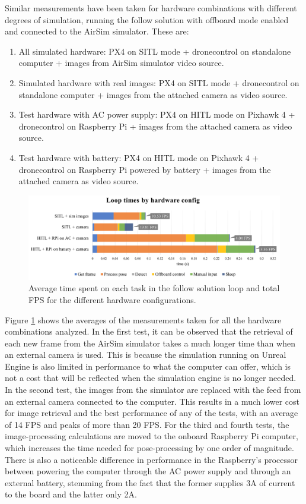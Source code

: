 Similar measurements have been taken for hardware combinations with different degrees of simulation, running the follow solution with offboard mode enabled and connected to the AirSim simulator.
These are:
\begin{enumerate}
    \item All simulated hardware: PX4 on SITL mode + dronecontrol on standalone computer + images from AirSim simulator video source.
    \item Simulated hardware with real images: PX4 on SITL mode + dronecontrol on standalone computer + images from the attached camera as video source.
    \item Test hardware with AC power supply: PX4 on HITL mode on Pixhawk 4 + dronecontrol on Raspberry Pi + images from the attached camera as video source.
    \item Test hardware with battery: PX4 on HITL mode on Pixhawk 4 + dronecontrol on Raspberry Pi powered by battery + images from the attached camera as video source.
\end{enumerate}


\begin{figure}
  \centering
  \includegraphics[width=.9\textwidth, keepaspectratio]{img/performance-graph.png}
  \caption{Average time spent on each task in the follow solution loop and total FPS for the different hardware configurations.}
  \label{fig:perf-analysis}
\end{figure}


Figure \ref{fig:perf-analysis} shows the averages of the measurements taken for all the hardware combinations analyzed.
In the first test, it can be observed that the retrieval of each new frame from the AirSim simulator takes a much longer time than when an external camera is used.
This is because the simulation running on Unreal Engine is also limited in performance to what the computer can offer, which is not a cost that will be reflected when the simulation engine is no longer needed.
In the second test, the images from the simulator are replaced with the feed from an external camera connected to the computer. 
This results in a much lower cost for image retrieval and the best performance of any of the tests, with an average of 14 FPS and peaks of more than 20 FPS.
For the third and fourth tests, the image-processing calculations are moved to the onboard Raspberry Pi computer, which increases the time needed for pose-processing by one order of magnitude.
There is also a noticeable difference in performance in the Raspberry's processor between powering the computer through the AC power supply and through an external battery, stemming from the fact that the former supplies 3A of current to the board and the latter only 2A.

